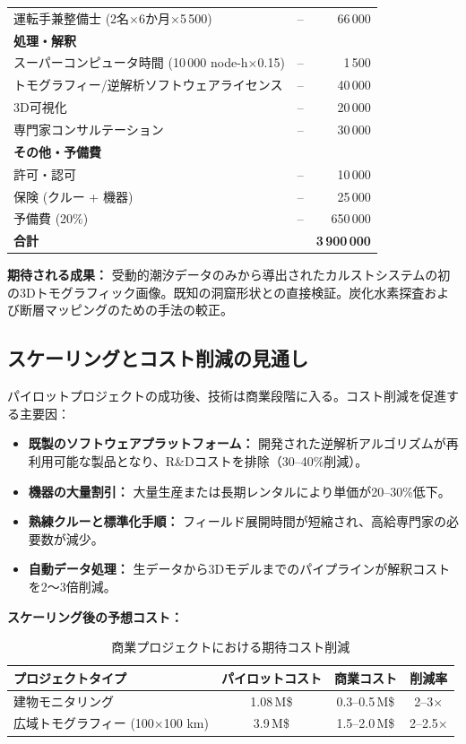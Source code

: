 \documentclass[12pt,a4paper]{article}
\theoremstyle{remark}
\begin{document}
\begin{table}[htbp]
\begin{tabular}{lrr}
			運転手兼整備士 (2名$\times$6か月$\times$5\,500) & – & 66\,000 \\
			\multicolumn{3}{l}{\textbf{処理・解釈}} \\
			スーパーコンピュータ時間 (10\,000 node-h$\times$0.15) & – & 1\,500 \\
			トモグラフィー/逆解析ソフトウェアライセンス & – & 40\,000 \\
			3D可視化 & – & 20\,000 \\
			専門家コンサルテーション & – & 30\,000 \\
			\multicolumn{3}{l}{\textbf{その他・予備費}} \\
			許可・認可 & – & 10\,000 \\
			保険 (クルー + 機器) & – & 25\,000 \\
			予備費 (20\%) & – & 650\,000 \\
			\midrule
			\textbf{合計} & & \textbf{3\,900\,000} \\
			\bottomrule
		\end{tabular}
	\end{table}
	
	\textbf{期待される成果：} 受動的潮汐データのみから導出されたカルストシステムの初の3Dトモグラフィック画像。既知の洞窟形状との直接検証。炭化水素探査および断層マッピングのための手法の較正。
	
	\subsection{スケーリングとコスト削減の見通し}
	
	パイロットプロジェクトの成功後、技術は商業段階に入る。コスト削減を促進する主要因：
	
	\begin{itemize}
		\item \textbf{既製のソフトウェアプラットフォーム：} 開発された逆解析アルゴリズムが再利用可能な製品となり、R\&Dコストを排除（30–40\%削減）。
		\item \textbf{機器の大量割引：} 大量生産または長期レンタルにより単価が20–30\%低下。
		\item \textbf{熟練クルーと標準化手順：} フィールド展開時間が短縮され、高給専門家の必要数が減少。
		\item \textbf{自動データ処理：} 生データから3Dモデルまでのパイプラインが解釈コストを2～3倍削減。
	\end{itemize}
	
	\textbf{スケーリング後の予想コスト：}
	
	\begin{table}[htbp]
		\centering
		\caption{商業プロジェクトにおける期待コスト削減}
		\label{tab:scaling}
		\begin{tabular}{lccc}
			\toprule
			\textbf{プロジェクトタイプ} & \textbf{パイロットコスト} & \textbf{商業コスト} & \textbf{削減率} \\
			\midrule
			建物モニタリング & 1.08\,M\$ & 0.3–0.5\,M\$ & 2–3× \\
			広域トモグラフィー (100×100 km) & 3.9\,M\$ & 1.5–2.0\,M\$ & 2–2.5× \\
			\bottomrule
		\end{tabular}
	\end{table}
	
\end{document}
